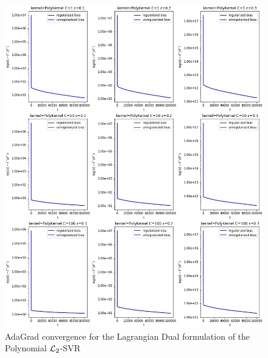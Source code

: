 \begin{figure}[H]
	\centering
	\includegraphics[scale=0.55]{img/laplacian_lagrangian_dual_l2_svr_loss_history}
	\caption{AdaGrad convergence for the Lagrangian Dual formulation of the Polynomial $\protect \mathcal{L}_2$-SVR}
	\label{fig:laplacian_lagrangian_dual_l2_svr_loss_history}
\end{figure}

